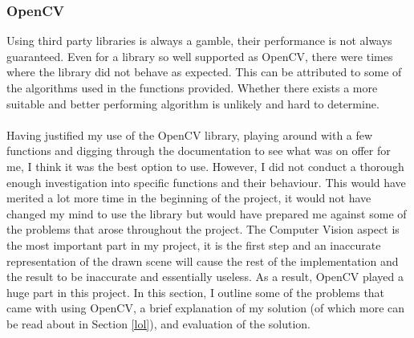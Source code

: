 \documentclass[11pt]{article}
\begin{document}
\subsubsection{OpenCV}
Using third party libraries is always a gamble, their performance is not
always guaranteed. Even for a library so well supported as OpenCV, there 
were times where the library did not behave as expected. This can be 
attributed to some of the algorithms used in the functions provided. 
Whether there exists a more suitable and better performing algorithm is
unlikely and hard to determine.\\
\\
Having justified my use of the OpenCV library, playing around with a 
few functions and digging through the documentation to see what was
on offer for me, I think it was the best option to use. 
However, I did not conduct a thorough enough investigation into specific
functions and their behaviour. This would have merited a lot more time in 
the beginning of the project, it would not have changed my mind to  use
the library but would have prepared me against some of the problems that 
arose throughout the project. The Computer Vision aspect is the most
important part in my project, it is the first step and an inaccurate
representation of the drawn scene will cause the rest of the 
implementation and the result to be inaccurate and essentially useless. As
a result, OpenCV played a huge part in this project. 
In this section, I outline some of the
problems that came with using OpenCV, a brief explanation of my solution
(of which more can be read about in Section \ref{lol}), and evaluation of
the solution. 
\end{document}
